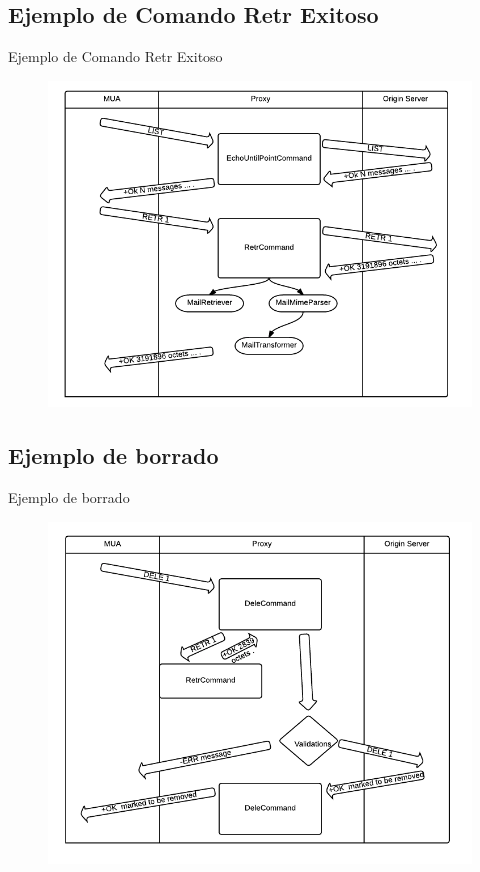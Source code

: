 \documentclass{beamer}
\begin{document}
\subsection{Ejemplo de Comando Retr  Exitoso}
\begin{frame}{Ejemplo de Comando Retr  Exitoso}
\begin{figure}[H]
\begin{center}
\includegraphics[scale=0.45]{images/charts/RetrExampleWorkFlow.png}
\end{center}
\end{figure}
\end{frame}

\subsection{Ejemplo de borrado}
\begin{frame}{Ejemplo de borrado}
\begin{figure}[H]
\begin{center}
\includegraphics[scale=0.47]{images/charts/DeleExampleWorkFlow.png}
\end{center}
\end{figure}
\end{frame}
\end{document}

